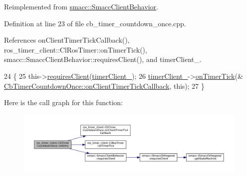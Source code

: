 Reimplemented from \hyperlink{classsmacc_1_1SmaccClientBehavior_a7962382f93987c720ad432fef55b123f}{smacc\+::\+Smacc\+Client\+Behavior}.



Definition at line 23 of file cb\+\_\+timer\+\_\+countdown\+\_\+once.\+cpp.



References on\+Client\+Timer\+Tick\+Callback(), ros\+\_\+timer\+\_\+client\+::\+Cl\+Ros\+Timer\+::on\+Timer\+Tick(), smacc\+::\+Smacc\+Client\+Behavior\+::requires\+Client(), and timer\+Client\+\_\+.


\begin{DoxyCode}
24 \{
25     this->\hyperlink{classsmacc_1_1SmaccClientBehavior_a917f001e763a1059af337bf4e164f542}{requiresClient}(\hyperlink{classros__timer__client_1_1CbTimerCountdownOnce_aad83d66fc9be53efdad961a270ec9e22}{timerClient\_});
26     \hyperlink{classros__timer__client_1_1CbTimerCountdownOnce_aad83d66fc9be53efdad961a270ec9e22}{timerClient\_}->\hyperlink{classros__timer__client_1_1ClRosTimer_a06ecf6427b5df59f29879ab3bd1f120c}{onTimerTick}(&
      \hyperlink{classros__timer__client_1_1CbTimerCountdownOnce_afe103d54afa6b6e7b89fc65447b69523}{CbTimerCountdownOnce::onClientTimerTickCallback}, \textcolor{keyword}{this});
27 \}
\end{DoxyCode}
Here is the call graph for this function\+:
\nopagebreak
\begin{figure}[H]
\begin{center}
\leavevmode
\includegraphics[width=350pt]{classros__timer__client_1_1CbTimerCountdownOnce_a06e15530538aed6ff5b55e75fe979907_cgraph}
\end{center}
\end{figure}
\mbox{\label{classros__timer__client_1_1CbTimerCountdownOnce_af2d3d5b803e19cd843db010d0406503a}} 
